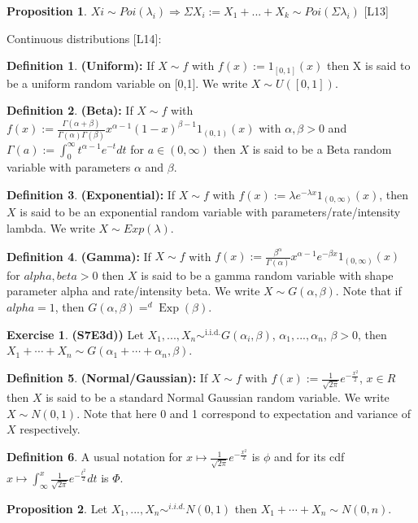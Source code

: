\documentclass[11pt]{article}
\theoremstyle{definition}
\DeclareMathOperator{\Exp}{Exp}
\DeclareMathOperator{\iid}{i.i.d.}
\newtheorem{prop}{Proposition}
\newtheorem{ex}{Exercise}
\newtheorem{defn}{Definition}
\begin{document}
\begin{prop}
$Xi\sim Poi(\lambda_i) \Rightarrow \Sigma X_i := X_1+...+X_k\sim  Poi(\Sigma\lambda_i)$ [L13]
\end{prop}
Continuous distributions [L14]:
\begin{defn}\textbf{(Uniform):} If $X\sim f$ with $f(x):=1_{[0,1]}(x)$ then X is said to be a uniform random variable on [0,1]. We write $X\sim U([0,1])$.
\end{defn}
\begin{defn}\textbf{(Beta):} If $X\sim f$ with $f(x):=\frac{\Gamma(\alpha+\beta)}{\Gamma(\alpha)\Gamma(\beta)}x^{\alpha-1}(1-x)^{\beta-1} 1_{(0,1)}(x)$ with $\alpha,\beta>0$ and $\Gamma(a):=\int_0^\infty t^{\alpha-1}e^{-t}dt$ for $a \in (0,\infty)$ then $X$ is said to be a Beta random variable with parameters $\alpha$ and $\beta$.
\end{defn}
\begin{defn}\textbf{(Exponential):} If $X\sim f$ with $f(x):=\lambda e^{-\lambda x}1_{(0,\infty)}(x)$, then $X$ is said to be an exponential random variable with parameters/rate/intensity lambda. We write $X\sim Exp(\lambda)$.
\end{defn}
\begin{defn}\textbf{(Gamma):} If $X\sim f$ with $f(x):=\frac{\beta^\alpha}{\Gamma(\alpha)}x^{\alpha-1}e^{-\beta x}1_{(0,\infty)}(x)$ for $alpha,beta>0$ then $X$ is said to be a gamma random variable with shape parameter alpha and rate/intensity beta. We write $X\sim G(\alpha,\beta)$. Note that if $alpha=1$, then $G(\alpha,\beta) =^d \Exp(\beta)$.
\end{defn}

\begin{ex}\textbf{(S7E3d))}
Let $X_1,...,X_n\sim^{\iid} G(\alpha_i,\beta)$, $\alpha_1,...,\alpha_n$, $\beta>0$, then $X_1+\cdots+X_n\sim G(\alpha_1+\cdots+\alpha_n,\beta)$.
\end{ex}

\begin{defn}\textbf{(Normal/Gaussian):} If $X\sim f$ with $f(x):=\frac{1}{\sqrt{2\pi}}e^{-\frac{x^2}{2}}$, $x \in R$ then $X$ is said to be a standard Normal Gaussian random variable. We write $X\sim N(0,1)$. Note that here 0 and 1 correspond to expectation and variance of $X$ respectively.
\end{defn}

\begin{defn}
A usual notation for $x\mapsto \frac{1}{\sqrt{2\pi}}e^{-\frac{x^2}{2}}$ is $\phi$ and for its cdf $x\mapsto \int^x_\infty \frac{1}{\sqrt{2\pi}}e^{-\frac{t^2}{2}}dt$ is $\Phi$.
\end{defn}
\begin{prop}
Let $X_1,...,X_n\sim^{i.i.d.} N(0,1)$ then $X_1+\cdots+X_n\sim N(0,n)$.
\end{prop}
\end{document}
